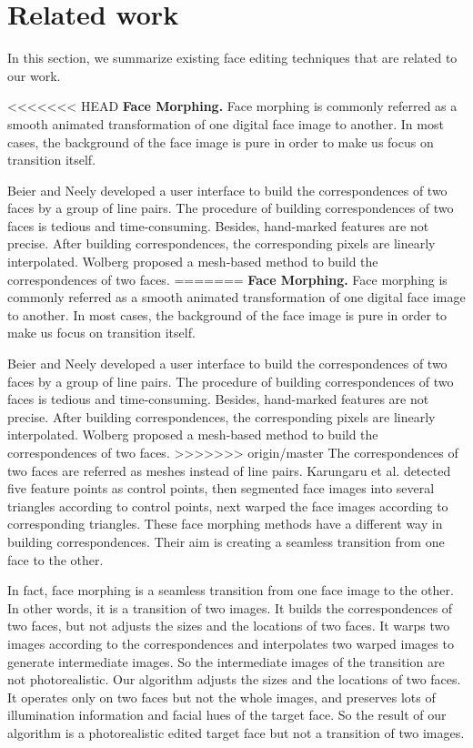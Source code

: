 \section{Related work}

In this section, we summarize existing face editing techniques that are related to our work.

<<<<<<< HEAD
\noindent\textbf{Face Morphing.} Face morphing is commonly referred as a smooth animated transformation of one digital face image to another.
In most cases, the background of the face image is pure in order to make us focus on transition itself.

Beier and Neely \cite{fbim} developed a user interface to build the correspondences of two faces by a group of line pairs.
The procedure of building correspondences of two faces is tedious and time-consuming. Besides, hand-marked features are not precise. After building correspondences, the corresponding pixels are linearly interpolated.
Wolberg \cite{wol} proposed a mesh-based method to build the correspondences of two faces.
=======
\noindent\textbf{Face Morphing.} Face morphing is commonly referred as a smooth animated transformation of one digital face image to another. 
In most cases, the background of the face image is pure in order to make us focus on transition itself. 

Beier and Neely \cite{fbim} developed a user interface to build the correspondences of two faces by a group of line pairs. 
The procedure of building correspondences of two faces is tedious and time-consuming. Besides, hand-marked features are not precise. After building correspondences, the corresponding pixels are linearly interpolated.  
Wolberg \cite{wol} proposed a mesh-based method to build the correspondences of two faces. 
>>>>>>> origin/master
The correspondences of two faces are referred as meshes instead of line pairs. Karungaru et al. \cite{mhf} detected five feature points as control points, then segmented face images into several triangles according to control points, next warped the face images according to corresponding triangles. These face morphing methods have a different way in building correspondences. Their aim is creating a seamless transition from one face to the other.

 In fact, face morphing is a seamless transition from one face image to the other. In other words, it is a transition of two images. It builds the correspondences of two faces, but not adjusts the sizes and the locations of two faces. It warps two images according to the correspondences and interpolates two warped images to generate intermediate images. So the intermediate images of the transition are not photorealistic. Our algorithm adjusts  the sizes and the locations of two faces. It operates only on two faces but not the whole images, and preserves lots of illumination information and facial hues of the target face. So the result of our algorithm is a photorealistic edited target face but not a transition of two images.

